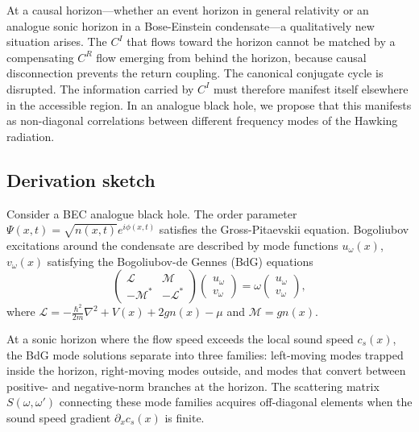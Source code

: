 \documentclass[aps,pra,preprint,groupedaddress,amsmath,amssymb,floatfix]{revtex4-2}
\begin{document}
At a causal horizon---whether an event horizon in general relativity or an analogue sonic horizon in a Bose-Einstein condensate---a qualitatively new situation arises. The $C^I$ that flows toward the horizon cannot be matched by a compensating $C^R$ flow emerging from behind the horizon, because causal disconnection prevents the return coupling. The canonical conjugate cycle is disrupted. The information carried by $C^I$ must therefore manifest itself elsewhere in the accessible region. In an analogue black hole, we propose that this manifests as non-diagonal correlations between different frequency modes of the Hawking radiation.

\subsection{Derivation sketch}

Consider a BEC analogue black hole. The order parameter $\Psi(x,t) = \sqrt{n(x,t)} e^{i\phi(x,t)}$ satisfies the Gross-Pitaevskii equation. Bogoliubov excitations around the condensate are described by mode functions $u_\omega(x)$, $v_\omega(x)$ satisfying the Bogoliubov-de Gennes (BdG) equations
\begin{equation}
\begin{pmatrix}
\mathcal{L} & \mathcal{M} \\
-\mathcal{M}^* & -\mathcal{L}^*
\end{pmatrix}
\begin{pmatrix} u_\omega \\ v_\omega \end{pmatrix}
= \omega \begin{pmatrix} u_\omega \\ v_\omega \end{pmatrix},
\end{equation}
where $\mathcal{L} = -\frac{\hbar^2}{2m}\nabla^2 + V(x) + 2g n(x) - \mu$ and $\mathcal{M} = g n(x)$.

At a sonic horizon where the flow speed exceeds the local sound speed $c_s(x)$, the BdG mode solutions separate into three families: left-moving modes trapped inside the horizon, right-moving modes outside, and modes that convert between positive- and negative-norm branches at the horizon. The scattering matrix $S(\omega, \omega')$ connecting these mode families acquires off-diagonal elements when the sound speed gradient $\partial_x c_s(x)$ is finite.
\end{document}
